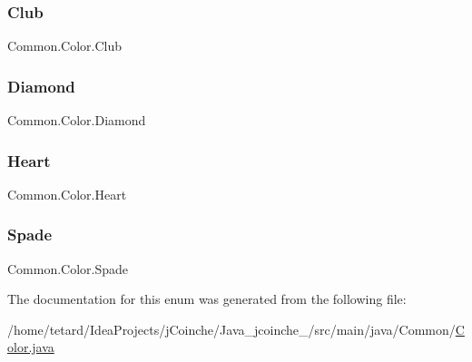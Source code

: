 \subsubsection{\texorpdfstring{Club}{Club}}
{\footnotesize\ttfamily Common.\+Color.\+Club}

\mbox{\label{enumCommon_1_1Color_a381cca0ea5d34bf5485690ec7d062ce4}} 
\subsubsection{\texorpdfstring{Diamond}{Diamond}}
{\footnotesize\ttfamily Common.\+Color.\+Diamond}

\mbox{\label{enumCommon_1_1Color_aef9e92e2320c284704b9892e75bf8348}} 
\subsubsection{\texorpdfstring{Heart}{Heart}}
{\footnotesize\ttfamily Common.\+Color.\+Heart}

\mbox{\label{enumCommon_1_1Color_a29e2b0d9c5ccdf8a1d449c41ebffc5d7}} 
\subsubsection{\texorpdfstring{Spade}{Spade}}
{\footnotesize\ttfamily Common.\+Color.\+Spade}



The documentation for this enum was generated from the following file\+:\begin{DoxyCompactItemize}
\item 
/home/tetard/\+Idea\+Projects/j\+Coinche/\+Java\+\_\+jcoinche\+\_/src/main/java/\+Common/\mbox{\hyperlink{Color_8java}{Color.\+java}}\end{DoxyCompactItemize}
